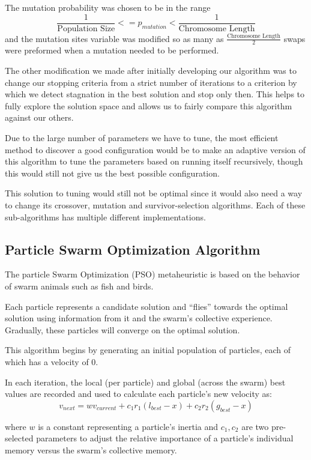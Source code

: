\documentclass[a4paper]{article}
\begin{document}
The mutation probability was chosen to be in the range $$\frac{1}{\text{Population Size}} <= p_\mathit{mutation} < \frac{1}{\text{Chromosome Length}}$$ and the mutation sites variable was modified so as many as $\frac{\text{Chromosome Length}}{2}$ swaps were preformed when a mutation needed to be performed.

The other modification we made after initially developing our algorithm was to change our stopping criteria from a strict number of iterations to a criterion by which we detect stagnation in the best solution and stop only then. This helps to fully explore the solution space and allows us to fairly compare this algorithm against our others.

Due to the large number of parameters we have to tune, the most efficient method to discover a good configuration would be to make an adaptive version of this algorithm to tune the parameters based on running itself recursively, though this would still not give us the best possible configuration.

This solution to tuning would still not be optimal since it would also need a way to change its crossover, mutation and survivor-selection algorithms. Each of these sub-algorithms has multiple different implementations.

\subsection{Particle Swarm Optimization Algorithm}
The particle Swarm Optimization (PSO) metaheuristic is based on the behavior of swarm animals such as fish and birds.

Each particle represents a candidate solution and ``flies'' towards the optimal solution using information from it and the swarm's collective experience. Gradually, these particles will converge on the optimal solution.

This algorithm begins by generating an initial population of particles, each of which has a velocity of 0.

In each iteration, the local (per particle) and global (across the swarm) best values are recorded and used to calculate each particle's new velocity \cite{ClassicalPSO} as:
$$
v_\mathit{next} = wv_\mathit{current} + c_1r_1(l_\mathit{best} - x) + c_2r_2(g_\mathit{best}-x)
$$

where $w$ is a constant representing a particle's inertia and $c_1, c_2$ are two pre-selected parameters to adjust the relative importance of a particle's individual memory versus the swarm's collective memory.
\end{document}
